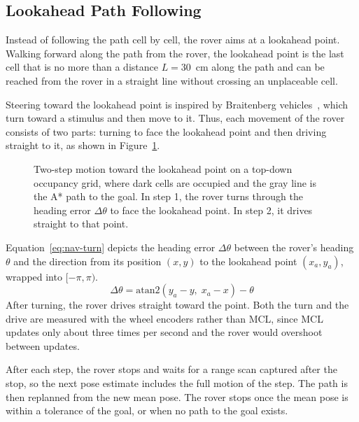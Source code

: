 \subsection{Lookahead Path Following}
\label{sec:path-following}

Instead of following the path cell by cell, the rover aims at a lookahead point. Walking
forward along the path from the rover, the lookahead point is the last cell that is no more
than a distance $L = 30$~cm along the path and can be reached from the rover in a straight line
without crossing an unplaceable cell.

Steering toward the lookahead point is inspired by Braitenberg vehicles~\cite{braitenberg1984vehicles},
which turn
toward a stimulus and then move to it. Thus, each movement of the rover consists of two parts:
turning to face the lookahead point and then driving straight to it, as shown in
Figure~\ref{fig:lookahead-steps}.

\begin{figure}[htbp]
  \centering
  
  \caption[Two-step motion toward the lookahead point]{Two-step motion toward the lookahead point
    on a top-down occupancy grid, where dark cells are occupied and the gray line is the A* path
    to the goal. In step 1, the rover turns through the heading error $\Delta\theta$ to face the
    lookahead point. In step 2, it drives straight to that point.}
  \label{fig:lookahead-steps}
\end{figure}

Equation~\ref{eq:nav-turn} depicts the heading error
$\Delta\theta$ between the rover's heading $\theta$ and the direction from its position
$(x, y)$ to the lookahead point $(x_a, y_a)$, wrapped into $[-\pi, \pi)$.
\begin{equation}
  \label{eq:nav-turn}
  \Delta\theta = \mathrm{atan2}(y_a - y,\; x_a - x) - \theta
\end{equation}
After turning, the rover drives straight toward the point. Both the turn and the drive are
measured with the wheel encoders rather than MCL, since MCL updates only about three times
per second and the rover would overshoot between updates.

After each step, the rover stops and waits for a range scan captured after the stop, so the
next pose estimate includes the full motion of the step. The path is then replanned from
the new mean pose. The rover stops
once the mean pose is within a tolerance of the goal, or when no path to the goal exists.

